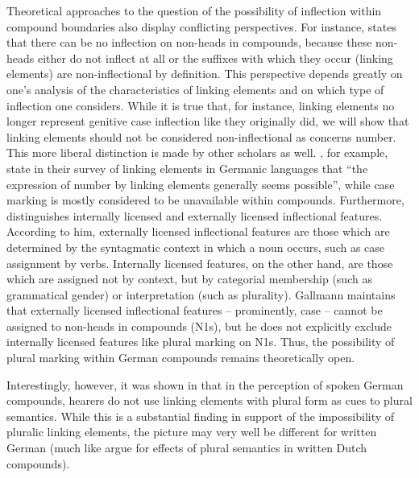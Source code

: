 Theoretical approaches to the question of the possibility of inflection within compound boundaries also display conflicting perspectives.
For instance, \textcite[9]{Schluecker2012} states that there can be no inflection on non-heads in compounds, because these non-heads either do not inflect at all or the suffixes with which they occur (\ie linking elements) are non-inflectional by definition.
This perspective depends greatly on one's analysis of the characteristics of linking elements and on which type of inflection one considers.
While it is true that, for instance, linking elements no longer represent genitive case inflection like they originally did, we will show that linking elements should not be considered non-inflectional as concerns number.
This more liberal distinction is made by other scholars as well.
\textcite[577]{FuhrhopKuerschner2015}, for example, state in their survey of linking elements in Germanic languages that ``the expression of number by linking elements generally seems possible'', while case marking is mostly considered to be unavailable within compounds.
Furthermore, \textcite[178--180]{Gallmann1998} distinguishes internally licensed and externally licensed inflectional features.
According to him, externally licensed inflectional features are those which are determined by the syntagmatic context in which a noun occurs, such as case assignment by verbs.
Internally licensed features, on the other hand, are those which are assigned not by context, but by categorial membership (such as grammatical gender) or interpretation (such as plurality).
Gallmann maintains that externally licensed inflectional features -- prominently, case -- cannot be assigned to non-heads in compounds (N1s), but he does not explicitly exclude internally licensed features like plural marking on N1s.
Thus, the possibility of plural marking within German compounds remains theoretically open.

Interestingly, however, it was shown in \textcite{KoesterEa2004} that in the perception of spoken German compounds, hearers do not use linking elements with plural form as cues to plural semantics.
While this is a substantial finding in support of the impossibility of pluralic linking elements, the picture may very well be different for written German (much like \citealt{SchreuderEa1998} argue for effects of plural semantics in written Dutch compounds).


